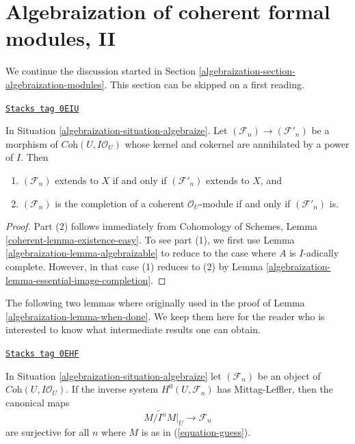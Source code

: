 \section{Algebraization of coherent formal modules, II}
\label{algebraization-section-algebraization-modules-general}
We continue the discussion started in
Section \ref{algebraization-section-algebraization-modules}.
This section can be skipped on a first reading.

\begin{lemma}
\label{algebraization-lemma-map-kernel-cokernel-on-closed}
\href{https://stacks.math.columbia.edu/tag/0EIU}{\texttt{Stacks tag 0EIU}}

In Situation \ref{algebraization-situation-algebraize}. Let
$(\mathcal{F}_n) \to (\mathcal{F}'_n)$ be a morphism of
$\textit{Coh}(U, I\mathcal{O}_U)$
whose kernel and cokernel are annihilated by a power of $I$. Then
\begin{enumerate}
\item $(\mathcal{F}_n)$ extends to $X$ if and only if
$(\mathcal{F}'_n)$ extends to $X$, and
\item $(\mathcal{F}_n)$ is the completion of a coherent $\mathcal{O}_U$-module
if and only if $(\mathcal{F}'_n)$ is.
\end{enumerate}
\end{lemma}

\begin{proof}

Part (2) follows immediately from
Cohomology of Schemes, Lemma \ref{coherent-lemma-existence-easy}.
To see part (1), we first use Lemma \ref{algebraization-lemma-algebraizable}
to reduce to the case where $A$ is $I$-adically complete.
However, in that case (1) reduces to (2) by
Lemma \ref{algebraization-lemma-essential-image-completion}.
\end{proof}

The following two lemmas where originally used in the proof
of Lemma \ref{algebraization-lemma-when-done}. We keep them here for the reader who is
interested to know what intermediate results one can obtain.

\begin{lemma}[When ML]
\label{algebraization-lemma-when-ML}
\href{https://stacks.math.columbia.edu/tag/0EHF}{\texttt{Stacks tag 0EHF}}

In Situation \ref{algebraization-situation-algebraize} let $(\mathcal{F}_n)$ be an object
of $\textit{Coh}(U, I\mathcal{O}_U)$. If the inverse system
$H^0(U, \mathcal{F}_n)$ has Mittag-Leffler, then the canonical maps
$$
\widetilde{M/I^nM}|_U \to \mathcal{F}_n
$$
are surjective for all $n$ where $M$ is as in (\ref{equation-guess}).
\end{lemma}


